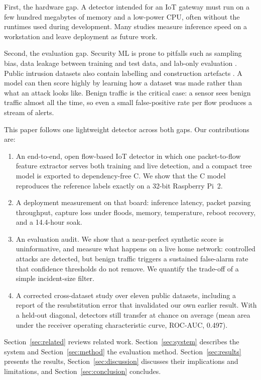 \documentclass[conference]{IEEEtran}
\begin{document}
First, the hardware gap. A detector intended for an IoT gateway must run
on a few hundred megabytes of memory and a low-power CPU, often without the
runtimes used during development. Many studies measure inference speed on a
workstation and leave deployment as future work.

Second, the evaluation gap. Security ML is prone to pitfalls such as
sampling bias, data leakage between training and test data, and lab-only
evaluation \cite{sommer2010outside,arp2022dos,apruzzese2023sok}. Public
intrusion datasets also contain labelling and construction artefacts
\cite{engelen2021troubleshooting,kenyon2020datasets}. A model can then
score highly by learning how a dataset was made rather than what an attack
looks like. Benign traffic is the critical case: a sensor sees benign
traffic almost all the time, so even a small false-positive rate per flow
produces a stream of alerts.

This paper follows one lightweight detector across both gaps. Our
contributions are:
\begin{enumerate}
\item An end-to-end, open flow-based IoT detector in which one packet-to-flow
feature extractor serves both training and live detection, and a compact
tree model is exported to dependency-free C. We show that the C model
reproduces the reference labels exactly on a 32-bit Raspberry Pi~2.
\item A deployment measurement on that board: inference latency, packet
parsing throughput, capture loss under floods, memory, temperature, reboot
recovery, and a 14.4-hour soak.
\item An evaluation audit. We show that a near-perfect synthetic score is
uninformative, and measure what happens on a live home network: controlled
attacks are detected, but benign traffic triggers a sustained false-alarm
rate that confidence thresholds do not remove. We quantify the trade-off of
a simple incident-size filter.
\item A corrected cross-dataset study over eleven public datasets,
including a report of the resubstitution error that invalidated our own
earlier result. With a held-out diagonal, detectors still transfer at
chance on average (mean area under the receiver operating characteristic
curve, ROC-AUC, 0.497).
\end{enumerate}

Section~\ref{sec:related} reviews related work. Section~\ref{sec:system}
describes the system and Section~\ref{sec:method} the evaluation method.
Section~\ref{sec:results} presents the results, Section~\ref{sec:discussion}
discusses their implications and limitations, and Section~\ref{sec:conclusion}
concludes.
\end{document}
